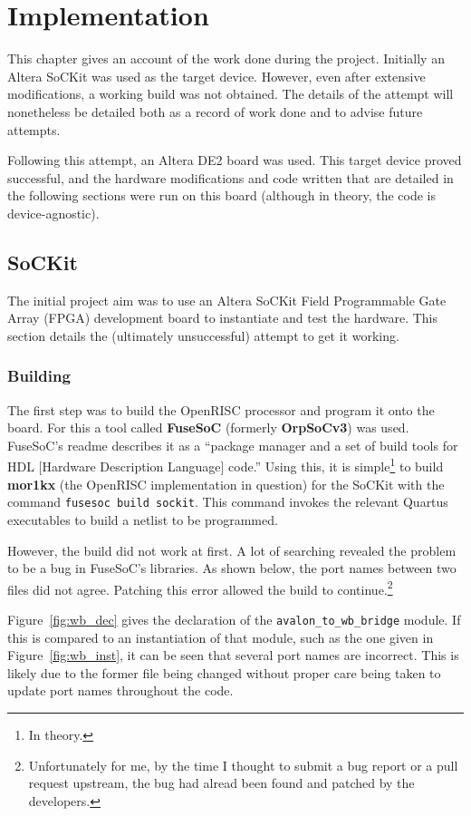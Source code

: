 \chapter{Implementation}
This chapter gives an account of the work done during the project. Initially an Altera SoCKit was used as the target device. However, even after extensive modifications, a working build was not obtained. The details of the attempt will nonetheless be detailed both as a record of work done and to advise future attempts.

Following this attempt, an Altera DE2 board was used. This target device proved successful, and the hardware modifications and code written that are detailed in the following sections were run on this board (although in theory, the code is device-agnostic).

\section{SoCKit}
The initial project aim was to use an Altera SoCKit Field Programmable Gate Array (FPGA) development board\cite{sockit} to instantiate and test the hardware. This section details the (ultimately unsuccessful) attempt to get it working.

\subsection{Building}
The first step was to build the OpenRISC processor and program it onto the board. For this a tool called \textbf{FuseSoC}\cite{fusesoc} (formerly \textbf{OrpSoCv3}) was used. FuseSoC's readme describes it as a ``package manager and a set of build tools for HDL [Hardware Description Language] code.'' Using this, it is simple\footnote{In theory.} to build \textbf{mor1kx} (the OpenRISC implementation in question) for the SoCKit with the command \verb|fusesoc build sockit|. This command invokes the relevant Quartus executables to build a netlist to be programmed.

However, the build did not work at first. A lot of searching revealed the problem to be a bug in FuseSoC's libraries. As shown below, the port names between two files did not agree. Patching this error allowed the build to continue.\footnote{Unfortunately for me, by the time I thought to submit a bug report or a pull request upstream, the bug had alread been found and patched by the developers.}

Figure~\ref{fig:wb_dec} gives the declaration of the \verb|avalon_to_wb_bridge| module. If this is compared to an instantiation of that module, such as the one given in Figure~\ref{fig:wb_inst}, it can be seen that several port names are incorrect. This is likely due to the former file being changed without proper care being taken to update port names throughout the code.

